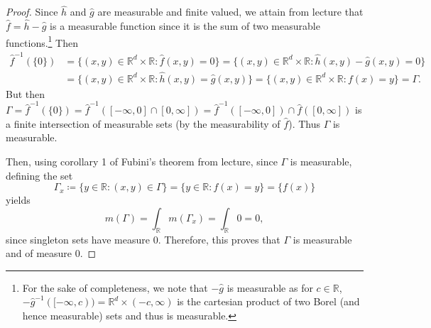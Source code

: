 \begin{proof}
Since \( \hat{h}  \) and \( \hat{g}  \) are measurable and finite valued, we attain from lecture that \( \hat{f} = \hat{h} - \hat{g}  \) is a measurable function since it is the sum of two measurable functions.\footnote{For the sake of completeness, we note that \(-\hat{g}  \) is measurable as for \( c \in \mathbb{R} \), \( -\hat{g} ^{-1} ([-\infty,c)) = \mathbb{R}^{d} \times (-c, \infty)  \) is the cartesian product of two Borel (and hence measurable) sets and thus is measurable.} Then
\begin{align*}
	\hat{f} ^{-1} (\{ 0 \} )  &= \{ (x,y) \in \mathbb{R}^{d} \times \mathbb{R} : \hat{f} (x,y) = 0 \} = \{ (x,y) \in \mathbb{R}^{d} \times \mathbb{R} : \hat{h} (x,y) - \hat{g} (x,y) = 0 \} \\
				  &= \{ (x,y) \in \mathbb{R}^{d}  \times \mathbb{R} : \hat{h} (x,y) = \hat{g} (x,y) \}  = \{ (x,y) \in \mathbb{R}^{d} \times \mathbb{R} : f(x) = y \} = \Gamma.
\end{align*}
But then \(\Gamma =  \hat{f} ^{-1} (\{ 0 \} ) = \hat{f} ^{-1} ([-\infty, 0] \cap [0, \infty]) = \hat{f} ^{-1} ([-\infty, 0]) \cap \hat{f} ([0,\infty])   \) is a finite intersection of measurable sets (by the measurability of \( \hat{f}  \)). Thus \( \Gamma \) is measurable.

Then, using corollary 1 of Fubini's theorem from lecture, since \( \Gamma \) is measurable, defining the set \[\Gamma_{x}  \coloneqq \{ y \in \mathbb{R} : (x, y) \in \Gamma \} = \{ y \in \mathbb{R} : f(x) = y \} = \{ f(x) \}    \] yields \[m(\Gamma) = \int_{\mathbb{R}} m(\Gamma_{x}  ) = \int_{\mathbb{R}} 0 = 0,\] since singleton sets have measure 0. Therefore, this proves that \( \Gamma \) is measurable and of measure 0.
\end{proof}
